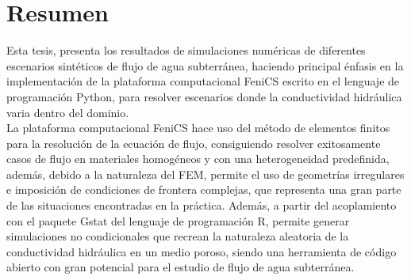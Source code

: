 \chapter*{Resumen}

Esta tesis, presenta los resultados de simulaciones numéricas de diferentes escenarios sintéticos de flujo de agua subterránea, haciendo principal énfasis en la implementación de la plataforma computacional FeniCS escrito en el lenguaje de programación Python, para resolver escenarios donde la conductividad hidráulica varia dentro del dominio.  
\\

La plataforma computacional FeniCS hace uso del método de elementos finitos para la resolución de la ecuación de flujo, consiguiendo resolver exitosamente casos de flujo en materiales homogéneos y con una heterogeneidad predefinida, además, debido a la naturaleza del FEM, permite el uso de geometrías irregulares e imposición de condiciones de frontera complejas, que representa una gran parte de las situaciones encontradas en la práctica. Además, a partir del acoplamiento con el paquete Gstat del lenguaje de programación R, permite generar simulaciones no condicionales que recrean la naturaleza aleatoria de la conductividad hidráulica en un medio poroso, siendo una herramienta de código abierto con gran potencial para el estudio de flujo de agua subterránea.


